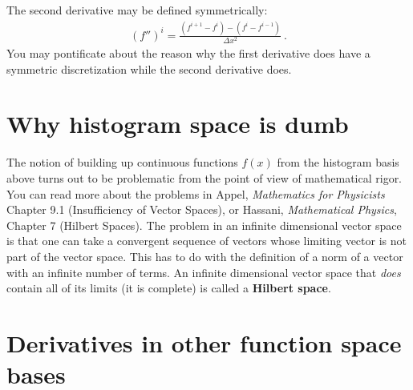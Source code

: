 \documentclass[
  11pt,
	colorful,
	raggedright,
]{tufte-style-thesis-flip}
\begin{document}
The second derivative may be defined symmetrically:
\begin{align}
  (f'')^i = \frac{(f^{i+1} - f^i) - (f^i - f^{i-1})}{\Delta x^2} \ .
\end{align}
You may pontificate about the reason why the first derivative does have a symmetric discretization while the second derivative does. 


\section{Why histogram space is dumb}
\label{sec:histogram:space:is:dumb}

The notion of building up continuous functions $f(x)$ from the histogram basis above turns out to be problematic from the point of view of mathematical rigor. You can read more about the problems in Appel, \emph{Mathematics for Physicists} Chapter 9.1 (Insufficiency of Vector Spaces), or Hassani, \emph{Mathematical Physics}, Chapter 7 (Hilbert Spaces). The problem in an infinite dimensional vector space is that one can take a convergent sequence of vectors whose limiting vector is not part of the vector space. This has to do with the definition of a norm of a vector with an infinite number of terms. An infinite dimensional vector space that \emph{does} contain all of its limits (it is complete) is called a \textbf{Hilbert space}.


\section{Derivatives in other function space bases}
\label{sec:derivatives}
\end{document}
